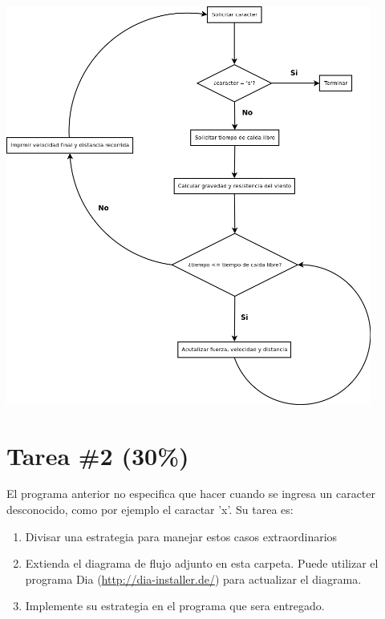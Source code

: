 \documentclass{article}
\begin{document}
\begin{center}
    \includegraphics[width=12cm]{Flujo.png}
\end{center}

\section*{Tarea \#2 (30\%)}
El programa anterior no especifica que hacer cuando se ingresa un caracter desconocido, como por ejemplo
el caractar 'x'. Su tarea es:
\begin{enumerate}
    \item{Divisar una estrategia para manejar estos casos extraordinarios}
    \item{Extienda el diagrama de flujo adjunto en esta carpeta. Puede utilizar el programa
    Dia (\url{http://dia-installer.de/}) para actualizar el diagrama.}
    \item{Implemente su estrategia en el programa que sera entregado.}
\end{enumerate}
\end{document}
